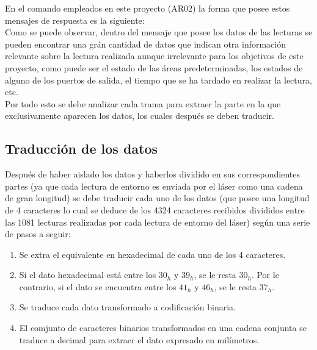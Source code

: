 En el comando empleados en este proyecto (AR02) la forma que posee estos mensajes de respuesta es la siguiente:\\
Como se puede observar, dentro del mensaje que posee los datos de las lecturas se pueden encontrar una grán cantidad de datos que indican otra información relevante sobre la lectura realizada aunque irrelevante para los objetivos de este proyecto, como puede ser el estado de las áreas predeterminadas, los estados de alguno de los puertos de salida, el tiempo que se ha tardado en realizar la lectura, etc.\\
Por todo esto se debe analizar cada trama para extraer la parte en la que exclusivamente aparecen los datos, los cuales después se deben traducir.

\subsection{Traducción de los datos}

Después de haber aislado los datos y haberlos dividido en sus correspondientes partes (ya que cada lectura de entorno es enviada por el láser como una cadena de gran longitud) se debe traducir cada uno de los datos (que posee una longitud de 4 caracteres lo cual se deduce de los 4324 caracteres recibidos divididos entre las 1081 lecturas realizadas por cada lectura de entorno del láser) según una serie de pasos a seguir:
\begin{enumerate}
	\item Se extra el equivalente en hexadecimal de cada uno de los 4 caracteres.
	\item Si el dato hexadecimal está entre los $30_{h}$ y  $39_{h}$, se le resta  $30_{h}$. Por le contrario, si el dato se encuentra entre los  $41_{h}$ y  $46_{h}$, se le resta $37_{h}$.
	\item Se traduce cada dato transformado a codificación binaria.
	\item El comjunto de caracteres binarios transformados en una cadena conjunta se traduce a decimal para extraer el dato expresado en milímetros.
\end{enumerate}
